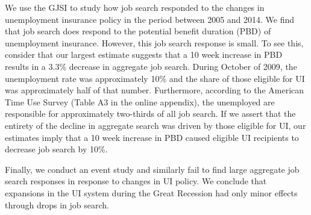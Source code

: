 \documentclass[12pt]{article}
\begin{document}
\begin{spacing}{2}
We use the GJSI to study how job search responded to the changes in unemployment insurance policy in the period between 2005 and 2014. We find that job search does respond to the potential benefit duration (PBD) of unemployment insurance. However, this job search response is small. To see this, consider that our largest estimate suggests that a 10 week increase in PBD results in a 3.3\% decrease in aggregate job search. During October of 2009, the unemployment rate was approximately 10\% and the share of those eligible for UI was approximately half of that number. Furthermore, according to the American Time Use Survey (Table A3 in the online appendix), the unemployed are responsible for approximately two-thirds of all job search. If we assert that the entirety of the decline in aggregate search was driven by those eligible for UI, our estimates imply that a 10 week increase in PBD caused eligible UI recipients to decrease job search by 10\%.

Finally, we conduct an event study and similarly fail to find large aggregate job search responses in response to changes in UI policy. We conclude that expansions in the UI system during the Great Recession had only minor effects through drops in job search.





\newpage





\newpage


\end{spacing}
\end{document}
